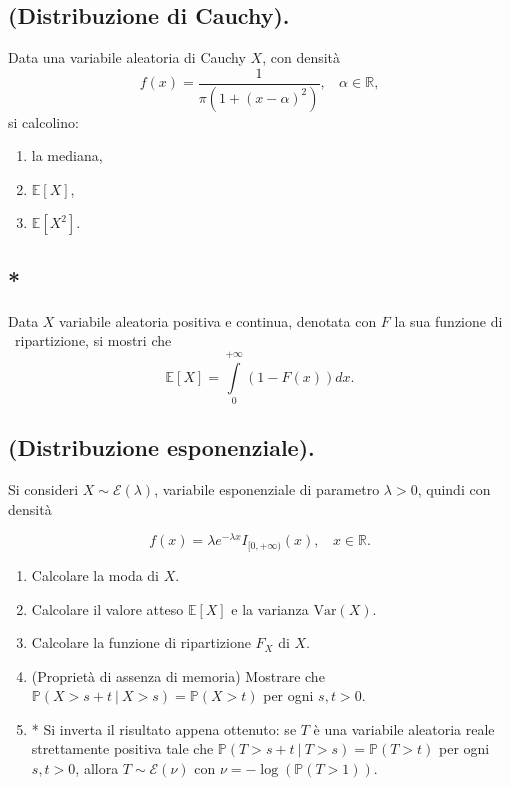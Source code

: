 \subsection{(Distribuzione di Cauchy).}

Data una variabile aleatoria di Cauchy $X$, con densità
\begin{equation*}
f( x) =\frac{1}{\pi \left( 1+( x-\alpha )^{2}\right)} ,\ \ \ \ \alpha \in \mathbb{R} ,
\end{equation*}
si calcolino:
\begin{enumerate}
\item la mediana,
\item $\mathbb{E}[ X]$,
\item $\mathbb{E}\left[ X^{2}\right]$.
\end{enumerate}
\subsection{*}

Data $X$ variabile aleatoria positiva e continua, denotata con $F$ la sua funzione di \ ripartizione, si mostri che
\begin{equation*}
\mathbb{E}[ X] =\int\limits _{0}^{+\infty }( 1-F( x)) dx.
\end{equation*}
\subsection{(Distribuzione esponenziale).}

Si consideri $X\sim \mathcal{E}( \lambda )$, variabile esponenziale di parametro $\lambda  >0$, quindi con densità


\begin{equation*}
f( x) =\lambda e^{-\lambda x} I_{[ 0,+\infty )}( x) ,\ \ \ \ x\in \mathbb{R} .
\end{equation*}
\begin{enumerate}
\item Calcolare la moda di $X$.
\item Calcolare il valore atteso $\mathbb{E}[ X]$ e la varianza $\mathrm{Var}( X)$.
\item Calcolare la funzione di ripartizione $F_{X}$ di $X$.
\item (Proprietà di assenza di memoria) Mostrare che $\mathbb{P}( X >s+t\ |\ X >s) =\mathbb{P}( X >t)$ per ogni $s,t >0$.
\item * Si inverta il risultato appena ottenuto: se $T$ è una variabile aleatoria reale strettamente positiva tale che $\mathbb{P}( T >s+t\ |\ T >s) =\mathbb{P}( T >t)$ per ogni $s,t >0$, allora $T\sim \mathcal{E}( \nu )$ con $\nu =-\log(\mathbb{P}( T >1))$.
\end{enumerate}
